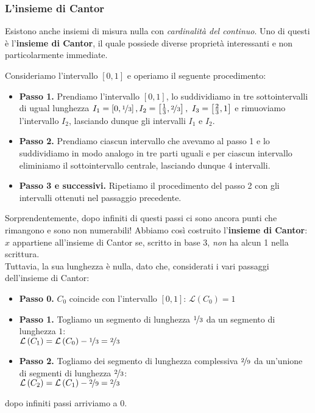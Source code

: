 \subsubsection{L'insieme di Cantor}
Esistono anche insiemi di misura nulla con \textit{cardinalità del continuo}. Uno di questi è l'\textbf{insieme di Cantor}, il quale possiede diverse proprietà interessanti e non particolarmente immediate.
\begin{examplewt}[Insieme di Cantor]
Consideriamo l'intervallo $\left[0,1\right]$ e operiamo il seguente procedimento:
\begin{itemize}
	\item \textbf{Passo 1.} Prendiamo l'intervallo $\left[0,1\right]$, lo suddividiamo in tre sottointervalli di ugual lunghezza $I_1=\left[0,\nicefrac{1}{3}\right], I_2=\left[\frac{1}{3},\nicefrac{2}{3}\right],\ I_3=\left[\frac{2}{3},1\right]$ e rimuoviamo l'intervallo $I_2$, lasciando dunque gli intervalli $I_1$ e $I_2$.
	\item \textbf{Passo 2.} Prendiamo ciascun intervallo che avevamo al passo 1 e lo suddividiamo in modo analogo in tre parti uguali e per ciascun intervallo eliminiamo il sottointervallo centrale, lasciando dunque 4 intervalli.
	\item \textbf{Passo 3 e successivi.} Ripetiamo il procedimento del passo 2 con gli intervalli ottenuti nel passaggio precedente.
\end{itemize}
Sorprendentemente, dopo infiniti di questi passi ci sono ancora punti che rimangono e sono non numerabili! Abbiamo così costruito l'\textbf{insieme di Cantor}: $x$ appartiene all'insieme di Cantor se, scritto in base 3, \textit{non} ha alcun 1 nella scrittura.\\
Tuttavia, la sua lunghezza è nulla, dato che, considerati i vari passaggi dell'insieme di Cantor:
\begin{itemize}
	\item \textbf{Passo 0.} $C_0$ coincide con l'intervallo $\left[0,1\right]$: $\mathcal{L}\left(C_0\right)=1$
	\item \textbf{Passo 1.} Togliamo un segmento di lunghezza $\nicefrac{1}{3}$ da un segmento di lunghezza $1$:\\ $\mathcal{L}\left(C_1\right)=\mathcal{L}\left(C_0\right)-\nicefrac{1}{3}=\nicefrac{2}{3}$
	\item \textbf{Passo 2.} Togliamo dei segmento di lunghezza complessiva $\nicefrac{2}{9}$ da un'unione di segmenti di lunghezza $\nicefrac{2}{3}$:\\ $\mathcal{L}\left(C_2\right)=\mathcal{L}\left(C_1\right)-\nicefrac{2}{9}=\nicefrac{2}{3}$
\end{itemize}
dopo infiniti passi arriviamo a $0$.
\end{examplewt}
